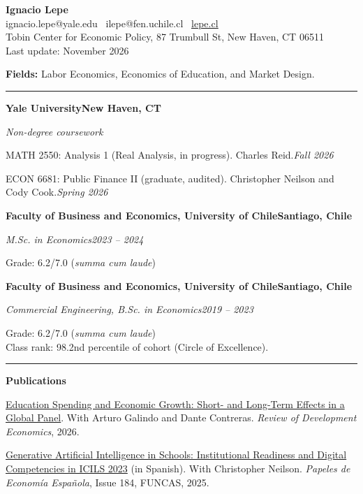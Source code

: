 \documentclass[11pt]{article}
\newcommand{\link}[2]{\href{#1}{\textcolor{linkblue}{\underline{#2}}}}
\newcommand{\tlink}[2]{\href{#1}{\textcolor{linkblue}{#2}}}
\newcommand{\cvsection}[1]{\vspace{9pt}{\bfseries #1}\par\vspace{2pt}\hrule\vspace{6pt}}
\newcommand{\HL}[2]{\textbf{#1}\hfill\textbf{#2}\par}
\newcommand{\RL}[2]{\textit{#1}\hfill\textit{#2}\par}
\newcommand{\gap}{\vspace{7pt}}
\begin{document}
\begin{center}
  {\LARGE\bfseries Ignacio Lepe}\\[3pt]
  ignacio.lepe@yale.edu \textbullet\ ilepe@fen.uchile.cl \textbullet\ \link{https://lepe.cl}{lepe.cl}\\[2pt]
  Tobin Center for Economic Policy, 87 Trumbull St, New Haven, CT 06511\\[2pt]
  Last update: November 2026
\end{center}

\textbf{Fields:} Labor Economics, Economics of Education, and Market Design.

\cvsection{EDUCATION}

\HL{Yale University}{New Haven, CT}
\textit{Non-degree coursework}\par
MATH 2550: Analysis 1 (Real Analysis, in progress). Charles Reid.\hfill\textit{Fall 2026}\par
ECON 6681: Public Finance II (graduate, audited). Christopher Neilson and Cody Cook.\hfill\textit{Spring 2026}\par
\gap

\HL{Faculty of Business and Economics, University of Chile}{Santiago, Chile}
\RL{M.Sc. in Economics}{2023 -- 2024}
Grade: 6.2/7.0 (\textit{summa cum laude})
\gap

\HL{Faculty of Business and Economics, University of Chile}{Santiago, Chile}
\RL{Commercial Engineering, B.Sc. in Economics}{2019 -- 2023}
Grade: 6.2/7.0 (\textit{summa cum laude})\\
Class rank: 98.2nd percentile of cohort (Circle of Excellence).

\cvsection{RESEARCH \& PUBLICATIONS}

\textbf{Publications}
\gap

\tlink{https://lepe.cl/papers/education-spending.html}{Education Spending and Economic Growth: Short- and Long-Term Effects in a Global Panel}. With Arturo Galindo and Dante Contreras. \textit{Review of Development Economics}, 2026.
\gap

\tlink{https://lepe.cl/papers/inteligencia-artificial.html}{Generative Artificial Intelligence in Schools: Institutional Readiness and Digital Competencies in ICILS 2023} (in Spanish). With Christopher Neilson. \textit{Papeles de Economía Española}, Issue 184, FUNCAS, 2025.
\gap
\end{document}
